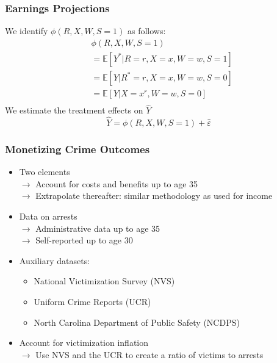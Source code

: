 \documentclass[static]{JJH-Beamer}
\begin{document}
\begin{frame}
\frametitle{Earnings Projections}
We identify $\phi\left(R, X, W, S = 1\right)$ as follows:
\begin{align*}
	& \phi\left(R, X, W, S = 1\right) \\
	&= \mathbb{E} \left[ Y^{*} | R = r, X = x, W = w, S = 1 \right] \\
	&= \mathbb{E} \left[ Y | R^{*} = r, X = x, W = w, S = 0 \right]\\
	&= \mathbb{E} \left[ Y | X = x^{r}, W = w, S = 0 \right]\\
\end{align*}
We estimate the treatment effects on $\hat{Y}$
\begin{equation}
	\hat{Y} = \phi \left( R, X, W, S=1 \right) + \hat{\varepsilon}
\end{equation}

\end{frame}


\begin{frame}
\frametitle{Monetizing Crime Outcomes}
\begin{itemize}
\item Two elements \\
	$\rightarrow$ Account for costs and benefits  up to age 35 \\
	$\rightarrow$ Extrapolate thereafter: similar methodology as used for income
\item Data on arrests \\
	$\rightarrow$ Administrative data up to age 35 \\
	$\rightarrow$ Self-reported up to age 30
\item Auxiliary datasets:
	\begin{itemize}
	\item National Victimization Survey (NVS)
	\item Uniform Crime Reports (UCR)
	\item North Carolina Department of Public Safety (NCDPS)
	\end{itemize}
\item Account for victimization inflation \\ 
	$\rightarrow$ Use NVS and the UCR to create a ratio of victims to arrests
\end{itemize}
\end{frame}

\end{document}
